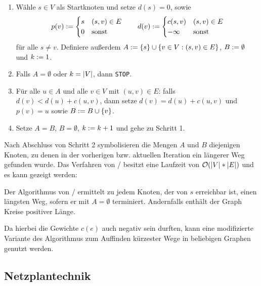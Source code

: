 \begin{enumerate}[label=Schritt \arabic*:, leftmargin=*, start=0]
	\item Wähle $s \in V$ als Startknoten und setze $d(s) = 0$, sowie
	\begin{equation*}
		p(v) \mathrel{:=} \begin{cases}
		s & (s,v) \in E \\ 0 & \text{sonst}
		\end{cases}
		\qquad
		d(v) \mathrel{:=} \begin{cases}
		c(s,v) & (s,v) \in E \\ -\infty &\text{sonst}
		\end{cases}
	\end{equation*}
	für alle $s \neq v$. Definiere außerdem $A \mathrel{:=} \left\{ s \right\} \cup \left\{ v \in V: (s,v) \in E \right\}$, $B \mathrel{:=} \emptyset$ und $k \mathrel{:=} 1$.
	\item Falls $A = \emptyset$ oder $k = \left| V \right|$, dann \texttt{STOP}.
	\item Für alle $u \in A$ und alle $v \in V$ mit $(u,v) \in E$: falls $d(v) < d(u) + c(u,v)$, dann setze $d(v) = d(u) + c(u,v)$ und $p(v) = u$ sowie $B \mathrel{:=} B \cup \left\{ v \right\}$.
	\item Setze $A = B$, $B = \emptyset$, $k \mathrel{:=} k+1$ und gehe zu Schritt 1.
\end{enumerate}

Nach Abschluss von Schritt 2 symbolisieren die Mengen $A$ und $B$ diejenigen Knoten, zu denen in der vorherigen bzw. aktuellen Iteration ein längerer Weg gefunden wurde. Das Verfahren von / besitzt eine Laufzeit von $\mathcal{O}(\left| V \right| * \left| E \right|)$ und es kann gezeigt werden:

\begin{aussage}
	Der Algorithmus von / ermittelt zu jedem Knoten, der von $s$ erreichbar ist, einen längsten Weg, sofern er mit $A = \emptyset$ terminiert. Andernfalls enthält der Graph Kreise positiver Länge.
\end{aussage}


Da hierbei die Gewichte $c(e)$ auch negativ sein durften, kann eine modifizierte Variante des Algorithmus zum Auffinden kürzester Wege in beliebigen Graphen genutzt werden.

\subsection{Netzplantechnik}

